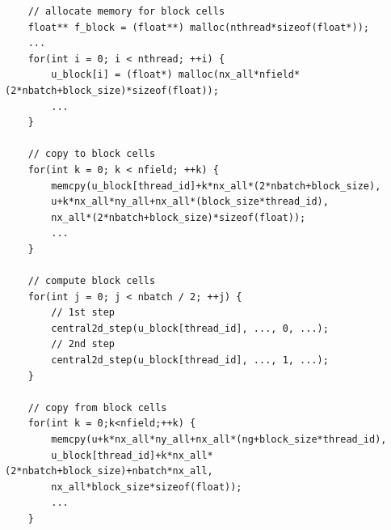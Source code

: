 \documentclass[12pt]{article}
\numberwithin{equation}{section}
\begin{document}
\scriptsize
\begin{lstlisting}
    // allocate memory for block cells
    float** f_block = (float**) malloc(nthread*sizeof(float*));
    ...
    for(int i = 0; i < nthread; ++i) {
        u_block[i] = (float*) malloc(nx_all*nfield*(2*nbatch+block_size)*sizeof(float));
        ...
    }

    // copy to block cells
    for(int k = 0; k < nfield; ++k) {
        memcpy(u_block[thread_id]+k*nx_all*(2*nbatch+block_size),
        u+k*nx_all*ny_all+nx_all*(block_size*thread_id),
        nx_all*(2*nbatch+block_size)*sizeof(float));
        ...
    }

    // compute block cells
    for(int j = 0; j < nbatch / 2; ++j) {
        // 1st step
        central2d_step(u_block[thread_id], ..., 0, ...);
        // 2nd step
        central2d_step(u_block[thread_id], ..., 1, ...);
    }

    // copy from block cells
    for(int k = 0;k<nfield;++k) {
        memcpy(u+k*nx_all*ny_all+nx_all*(ng+block_size*thread_id),
        u_block[thread_id]+k*nx_all*(2*nbatch+block_size)+nbatch*nx_all,
        nx_all*block_size*sizeof(float));
        ...
    }
\end{lstlisting}






%
%
%
%
\end{document}

